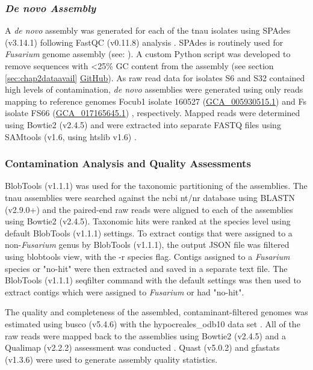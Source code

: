 \subsubsection{\textit{De novo Assembly}}
A \textit{de novo} assembly was generated for each of the \ac{tnau} isolates using SPAdes (v3.14.1) \parencite{Prjibelski2020} following FastQC (v0.11.8) analysis \parencite{Andrews2010}. SPAdes is routinely used for \textit{Fusarium} genome assembly
(see: \textcite{Armitage2018, Hudson2020, Tanaka2022}). A custom Python script was developed to remove sequences with <25\% GC content from the assembly (see section \ref{sec:chap2dataavail}  \href{https://github.com/JamiePike/NewTools-Project/blob/master/bin/gcTrimmer.py}{GitHub}). As raw read data for isolates S6 and S32 contained high levels of contamination, \textit{de novo} assemblies were generated using only reads mapping to reference genomes \ac{Focub1} isolate 160527 (\href{https://www.ncbi.nlm.nih.gov/datasets/genome/GCA_005930515.1/}{GCA\_005930515.1}) \parencite{Asai2019} and \acl{Fs} isolate FS66 (\href{https://www.ncbi.nlm.nih.gov/datasets/genome/GCA_017165645.1/}{GCA\_017165645.1}) \parencite{Cui2021}, respectively. Mapped reads were determined using Bowtie2 (v2.4.5) and were extracted into separate FASTQ files using SAMtools (v1.6, using htslib v1.6) \parencite{Danecek2021}. 

\subsubsection{Contamination Analysis and Quality Assessments}
BlobTools (v1.1.1) \parencite{Laetsch2017} was used for the taxonomic partitioning of the assemblies. The \ac{tnau} assemblies were searched against the \ac{ncbi} nt/nr database using BLASTN (v2.9.0+) and the paired-end raw reads were aligned to each of the assemblies using Bowtie2 (v2.4.5). Taxonomic hits were ranked at the species level using default BlobTools (v1.1.1) settings. To extract contigs that were assigned to a non-\textit{Fusarium} genus by BlobTools (v1.1.1), the output JSON file was filtered using blobtools view, with the -r species flag. Contigs assigned to a \textit{Fusarium} species or "no-hit" were then extracted and saved in a separate text file. The BlobTools (v1.1.1) seqfilter command with the default settings was then used to extract contigs which were assigned to \textit{Fusarium} or had "no-hit".

The quality and completeness of the assembled, contaminant-filtered genomes was estimated using \ac{busco} (v5.4.6) with the hypocreales\_odb10 data set \parencite{Manni2021}. All of the raw reads were mapped back to the assemblies using Bowtie2 (v2.4.5) and a Qualimap (v2.2.2) assessment was conducted \parencite{Garcia-Alcalde2012}. Quast (v5.0.2) \parencite{Gurevich2013}  and gfastats (v1.3.6) \parencite{Formenti2022} were used to generate assembly quality statistics. 


